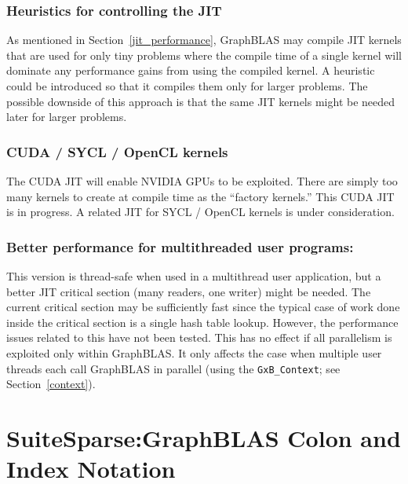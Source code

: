 \documentclass[12pt]{article}
\begin{document}
\subsubsection{Heuristics for controlling the JIT}
As mentioned in Section~\ref{jit_performance}, GraphBLAS may compile JIT
kernels that are used for only tiny problems where the compile time of a single
kernel will dominate any performance gains from using the compiled kernel.  A
heuristic could be introduced so that it compiles them only for larger
problems.  The possible downside of this approach is that the same JIT kernels
might be needed later for larger problems.

\subsubsection{CUDA / SYCL / OpenCL kernels}
The CUDA JIT will enable NVIDIA GPUs to be exploited.  There are simply too
many kernels to create at compile time as the ``factory kernels.''  This CUDA
JIT is in progress.  A related JIT for SYCL / OpenCL kernels is under
consideration.

\subsubsection{Better performance for multithreaded user programs:}
This version is thread-safe when used in a multithread user application, but a
better JIT critical section (many readers, one writer) might be needed.  The
current critical section may be sufficiently fast since the typical case of
work done inside the critical section is a single hash table lookup.  However,
the performance issues related to this have not been tested.  This has no
effect if all parallelism is exploited only within GraphBLAS.  It only
affects the case when multiple user threads each call GraphBLAS in parallel
(using the \verb'GxB_Context'; see Section~\ref{context}).

\newpage


\newpage
\section{SuiteSparse:GraphBLAS Colon and Index Notation} %
\label{colon}
\end{document}
